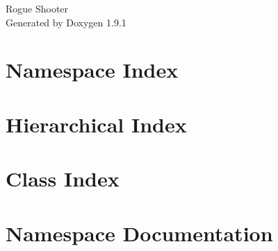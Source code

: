 \let\mypdfximage\pdfximage\def\pdfximage{\immediate\mypdfximage}\documentclass[twoside]{book}
\newcommand{\+}{\discretionary{\mbox{\scriptsize$\hookleftarrow$}}{}{}}
\newcommand{\clearemptydoublepage}{%
  \newpage{\pagestyle{empty}\cleardoublepage}%
}
\begin{document}
\raggedbottom

\hypersetup{pageanchor=false,
             bookmarksnumbered=true,
             pdfencoding=unicode
            }
\begin{titlepage}
\vspace*{7cm}
\begin{center}%
{\Large Rogue Shooter }\\
\vspace*{1cm}
{\large Generated by Doxygen 1.9.1}\\
\end{center}
\end{titlepage}
\clearemptydoublepage
{}
\tableofcontents
\clearemptydoublepage
{}
\hypersetup{pageanchor=true}

\chapter{Namespace Index}

\chapter{Hierarchical Index}

\chapter{Class Index}

\chapter{Namespace Documentation}













\end{document}
